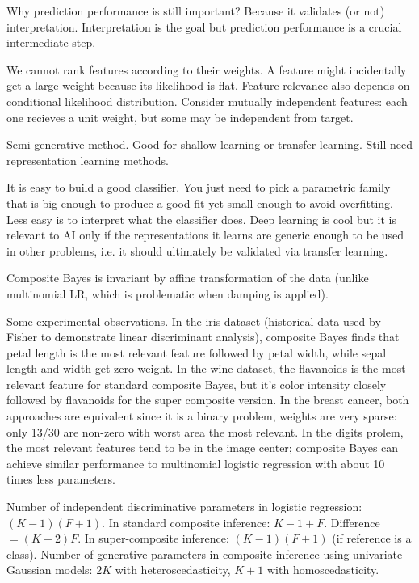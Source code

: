 \documentclass[english]{scrartcl}
\begin{document}
{\color{red} Why prediction performance is still important? Because it validates (or not) interpretation. Interpretation is the goal but prediction performance is a crucial intermediate step.}

{\color{red} We cannot rank features according to their weights. A feature might incidentally get a large weight because its likelihood is flat. Feature relevance also depends on conditional likelihood distribution. Consider mutually independent features: each one recieves a unit weight, but some may be independent from target.}

{\color{red} Semi-generative method. Good for shallow learning or transfer learning. Still need representation learning methods.}

{\color{red} It is easy to build a good classifier. You just need to pick a parametric family that is big enough to produce a good fit yet small enough to avoid overfitting. Less easy is to interpret what the classifier does. Deep learning is cool but it is relevant to AI only  if the representations it learns are generic enough to be used in other problems, i.e. it should ultimately be validated via transfer learning.}

{\color{red} Composite Bayes is invariant by affine transformation of the data (unlike multinomial LR, which is problematic when damping is applied).}

Some experimental observations. In the iris dataset (historical data used by Fisher to demonstrate linear discriminant analysis), composite Bayes finds that petal length is the most relevant feature followed by petal width, while sepal length and width get zero weight. In the wine dataset, the flavanoids is the most relevant feature for standard composite Bayes, but it's color intensity closely followed by flavanoids for the super composite version. In the breast cancer, both approaches are equivalent since it is a binary problem, weights are very sparse: only 13/30 are non-zero with worst area the most relevant. In the digits prolem, the most relevant features tend to be in the image center; composite Bayes can achieve similar performance to multinomial logistic regression with about 10 times less parameters.

Number of independent discriminative parameters in logistic regression: $(K-1)(F+1)$. In standard composite inference: $K-1+F$. Difference $=(K-2)F$. In super-composite inference: $(K-1)(F+1)$ (if reference is a class). Number of generative parameters in composite inference using univariate Gaussian models: $2K$ with heteroscedasticity, $K+1$ with homoscedasticity. 
\end{document}
